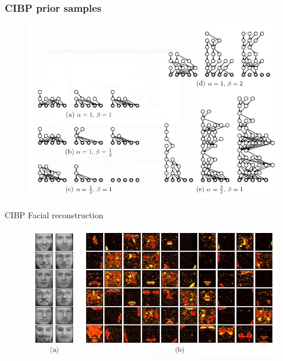 \documentclass[13pt]{beamer}
\begin{document}
\begin{frame}
\frametitle{CIBP prior samples}

\begin{figure}
\begin{center}
\includegraphics[scale=0.6]{./img/cibp-samples.png}
\end{center}
\end{figure}
\end{frame}
\begin{frame}{CIBP Facial reconstruction}
\begin{figure}
\begin{center}
\includegraphics[scale=0.6]{./img/cibp-reconstructions.png}
\end{center}
\end{figure}
\end{frame}
\end{document}
